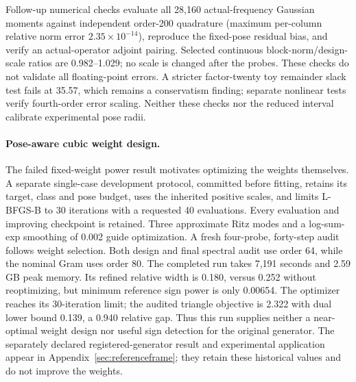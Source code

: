 Follow-up numerical checks evaluate all 28,160 actual-frequency Gaussian moments
against independent order-200 quadrature (maximum per-column relative norm
error $2.35\times10^{-14}$), reproduce the fixed-pose residual bias, and verify
an actual-operator adjoint pairing. Selected continuous block-norm/design-scale
ratios are 0.982--1.029; no scale is changed after the probes. These checks do
not validate all floating-point errors. A stricter factor-twenty toy remainder
slack test fails at 35.57, which remains a conservatism finding; separate
nonlinear tests verify fourth-order error scaling. Neither these checks nor the
reduced interval calibrate experimental pose radii.

\paragraph{Pose-aware cubic weight design.}
The failed fixed-weight power result motivates optimizing the weights themselves.
A separate single-case development protocol, committed before fitting, retains
its target, class and pose budget, uses the inherited positive scales, and limits
L-BFGS-B to 30 iterations with a requested 40 evaluations. Every evaluation and
improving checkpoint is retained. Three approximate Ritz modes and a
log-sum-exp smoothing of 0.002 guide optimization. A fresh four-probe,
forty-step audit follows weight selection. Both design and final spectral audit
use order 64, while the nominal Gram uses order 80. The completed run takes
7,191 seconds and 2.59 GB peak memory. Its refined relative width is 0.180,
versus 0.252 without reoptimizing, but minimum reference sign power is only
0.00654. The optimizer reaches its 30-iteration limit; the audited triangle
objective is 2.322 with dual lower bound 0.139, a 0.940 relative gap. Thus this
run supplies neither a near-optimal weight design nor useful sign detection for
the original generator. The separately declared registered-generator result
and experimental application appear in Appendix~\ref{sec:referenceframe};
they retain these historical values and do not improve the weights.

